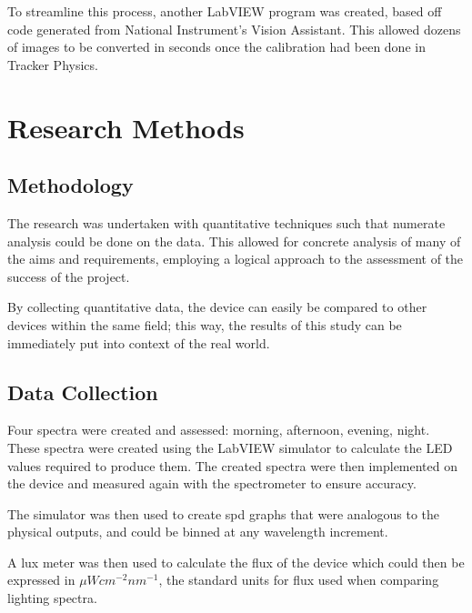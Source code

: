 To streamline this process, another LabVIEW program was created, based off code generated from National Instrument's Vision Assistant. This allowed dozens of images to be converted in seconds once the calibration had been done in Tracker Physics. 

\section{Research Methods}

\subsection{Methodology}

The research was undertaken with quantitative techniques such that numerate analysis could be done on the data. This allowed for concrete analysis of many of the aims and requirements, employing a logical approach to the assessment of the success of the project.

By collecting quantitative data, the device can easily be compared to other devices within the same field; this way, the results of this study can be immediately put into context of the real world.

\subsection{Data Collection}

Four spectra were created and assessed: \acrfull{morning}, \acrfull{afternoon}, \acrfull{evening}, \acrfull{night}. These spectra were created using the LabVIEW simulator to calculate the LED values required to produce them. The created spectra were then implemented on the device and measured again with the spectrometer to ensure accuracy.

The simulator was then used to create \acrfull{spd} graphs that were analogous to the physical outputs, and could be binned at any wavelength increment.

A \gls{lux} meter was then used to calculate the \gls{flux} of the device which could then be expressed in $\mu W cm^{-2} nm^{-1}$, the standard units for \gls{flux} used when comparing lighting spectra.